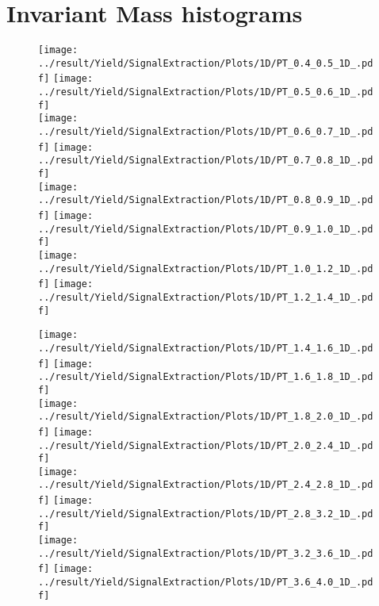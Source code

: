 \section{Invariant Mass histograms}
\label{sec:InvMass_Histo}

\begin{figure}[!h]
	\centering
		\texttt{[image: ../result/Yield/SignalExtraction/Plots/1D/PT\_0.4\_0.5\_1D\_.pdf]}
		\texttt{[image: ../result/Yield/SignalExtraction/Plots/1D/PT\_0.5\_0.6\_1D\_.pdf]}\\
		\texttt{[image: ../result/Yield/SignalExtraction/Plots/1D/PT\_0.6\_0.7\_1D\_.pdf]}
		\texttt{[image: ../result/Yield/SignalExtraction/Plots/1D/PT\_0.7\_0.8\_1D\_.pdf]}\\		
		\texttt{[image: ../result/Yield/SignalExtraction/Plots/1D/PT\_0.8\_0.9\_1D\_.pdf]}
		\texttt{[image: ../result/Yield/SignalExtraction/Plots/1D/PT\_0.9\_1.0\_1D\_.pdf]}\\
		\texttt{[image: ../result/Yield/SignalExtraction/Plots/1D/PT\_1.0\_1.2\_1D\_.pdf]}
		\texttt{[image: ../result/Yield/SignalExtraction/Plots/1D/PT\_1.2\_1.4\_1D\_.pdf]}
\end{figure}

\begin{figure}[!h]
	\centering
		\texttt{[image: ../result/Yield/SignalExtraction/Plots/1D/PT\_1.4\_1.6\_1D\_.pdf]}
		\texttt{[image: ../result/Yield/SignalExtraction/Plots/1D/PT\_1.6\_1.8\_1D\_.pdf]}\\
		\texttt{[image: ../result/Yield/SignalExtraction/Plots/1D/PT\_1.8\_2.0\_1D\_.pdf]}
		\texttt{[image: ../result/Yield/SignalExtraction/Plots/1D/PT\_2.0\_2.4\_1D\_.pdf]}\\
		\texttt{[image: ../result/Yield/SignalExtraction/Plots/1D/PT\_2.4\_2.8\_1D\_.pdf]}
		\texttt{[image: ../result/Yield/SignalExtraction/Plots/1D/PT\_2.8\_3.2\_1D\_.pdf]}\\
		\texttt{[image: ../result/Yield/SignalExtraction/Plots/1D/PT\_3.2\_3.6\_1D\_.pdf]}
		\texttt{[image: ../result/Yield/SignalExtraction/Plots/1D/PT\_3.6\_4.0\_1D\_.pdf]}
\end{figure}

